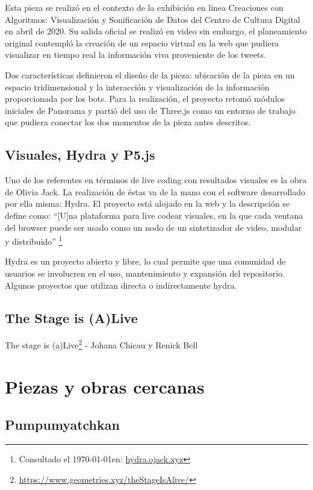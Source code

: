 Esta pieza se realizó en el contexto de la exhibición en línea Creaciones con Algoritmos: Visualización y Sonificación de Datos del Centro de Cultura Digital en abril de 2020. Su salida oficial se realizó en video sin embargo, el planeamiento original contempló la creación de un espacio virtual en la web que pudiera visualizar en tiempo real la información viva proveniente de los tweets.

Dos características definieron el diseño de la pieza: ubicación de la pieza en un espacio tridimensional y la interacción y visualización de la información proporcionada por los bots. Para la realización, el proyecto retomó módulos iniciales de Panorama y partió del uso de Three.js como un entorno de trabajo que pudiera conectar los dos momentos de la pieza antes descritos.

\subsection{Visuales, Hydra y P5.js}

Uno de los referentes en términos de live coding con resultados visuales es la obra de Olivia Jack. La realización de éstas va de la mano con el software desarrollado por ella misma: Hydra. El proyecto está alojado en la web y la descripción se define como: ``[U]na plataforma para live codear visuales, en la que cada ventana del browser puede ser usado como un nodo de un sintetizador de video, modular y distribuido'' \footnote{Consultado el \today en: \url{hydra.ojack.xyz}}

Hydra es un proyecto abierto y libre, lo cual permite que una comunidad de usuarios se involucren en el uso, mantenimiento y expansión del repositorio. Algunos proyectos que utilizan directa o indirectamente hydra. 

\subsection{The Stage is (A)Live}

The stage is (a)Live\footnote{\url{https://www.geometries.xyz/theStageIsAlive/}} - Johana Chicau y Renick Bell

\section{Piezas y obras cercanas} %

\subsection{Pumpumyatchkan}


